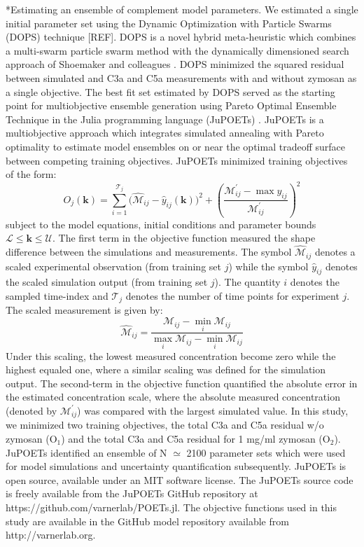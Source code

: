 \documentclass[12pt]{article}
\makeatletter
\renewcommand\subsection{\@startsection
	{subsection}{2}{0mm}
	{-0.05in}
	{-0.5\baselineskip}
	{\normalfont\normalsize\bfseries}}
\makeatother
\begin{document}
\subsection*{Estimating an ensemble of complement model parameters.}
We estimated a single initial parameter set using the Dynamic Optimization with Particle Swarms (DOPS) technique [REF].
DOPS is a novel hybrid meta-heuristic which combines a multi-swarm particle swarm method with the dynamically dimensioned search approach of Shoemaker and colleagues \cite{Tolson2007}.
DOPS minimized the squared residual between simulated and C3a and C5a measurements with and without zymosan as a single objective.
The best fit set estimated by DOPS served as the starting point for multiobjective ensemble generation using Pareto Optimal Ensemble Technique in the Julia programming language (JuPOETs) \cite{JuPOETs-BioArXiv}.
JuPOETs is a multiobjective approach which integrates simulated annealing with Pareto optimality to estimate model ensembles on or near the optimal tradeoff surface between competing training objectives. JuPOETs minimized training objectives of the form:
\begin{equation}\label{eqn_cost2}
	O_{j}(\mathbf{k}) = \sum_{i=1}^{\mathcal{T}_{j}}\biggl(\hat{\mathcal{M}}_{ij}-\hat{y}_{ij}(\mathbf{k})\biggr)^2 + \left(\frac{{\mathcal{M}^{\prime}_{ij}}-\max{y_{ij}}}{{\mathcal{M}^{\prime}_{ij}}}\right)^{2}
\end{equation}subject to the model equations, initial conditions and parameter bounds $\mathcal{L}\leq\mathbf{k}\leq\mathcal{U}$.
The first term in the objective function measured the shape difference between the simulations and measurements.
The symbol $\hat{\mathcal{M}}_{ij}$ denotes a scaled experimental observation (from training set $j$) while the symbol $\hat{y}_{ij}$ denotes the scaled simulation output (from training set $j$). The quantity $i$ denotes the sampled time-index and $\mathcal{T}_{j}$ denotes the number of time points for experiment $j$.
The scaled measurement is given by:
\begin{equation}\label{norm_exp_data}
\hat{\mathcal{M}}_{ij} = \frac{\mathcal{M}_{ij} - \min_{i}\mathcal{M}_{ij}}{\max_{i}{\mathcal{M}_{ij}}-\min_{i}{\mathcal{M}_{ij}}}
\end{equation}
Under this scaling, the lowest measured concentration become zero while the highest equaled one, where a similar scaling was defined for the simulation output.
The second-term in the objective function quantified the absolute error in the estimated concentration scale, where the absolute measured
concentration (denoted by $\mathcal{M}^{\prime}_{ij}$) was compared with the largest simulated value.
In this study, we minimized two training objectives, the total C3a and C5a residual w/o zymosan (O$_{1}$) and the total C3a and C5a residual for 1 mg/ml zymosan (O$_{2}$).
JuPOETs identified an ensemble of N $\simeq$ 2100 parameter sets which were used for model simulations and uncertainty quantification subsequently.
JuPOETs is open source, available under an MIT software license.
The JuPOETs source code is freely available from the JuPOETs GitHub repository at https://github.com/varnerlab/POETs.jl.
The objective functions used in this study are available in the GitHub model repository available from http://varnerlab.org.
\end{document}
